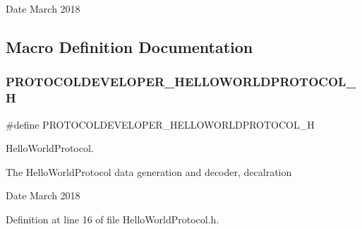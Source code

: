 \begin{DoxyDate}{Date}
March 2018 
\end{DoxyDate}


\subsection{Macro Definition Documentation}
\mbox{\label{group__Protocol_ga2ed8336db1a0003c9333b1a4a38e21f2}} 
\subsubsection{\texorpdfstring{PROTOCOLDEVELOPER\_HELLOWORLDPROTOCOL\_H}{PROTOCOLDEVELOPER\_HELLOWORLDPROTOCOL\_H}}
{\footnotesize\ttfamily \#define P\+R\+O\+T\+O\+C\+O\+L\+D\+E\+V\+E\+L\+O\+P\+E\+R\+\_\+\+H\+E\+L\+L\+O\+W\+O\+R\+L\+D\+P\+R\+O\+T\+O\+C\+O\+L\+\_\+H}



Hello\+World\+Protocol. 

The Hello\+World\+Protocol data generation and decoder, decalration

\begin{DoxyDate}{Date}
March 2018 
\end{DoxyDate}


Definition at line 16 of file Hello\+World\+Protocol.\+h.

